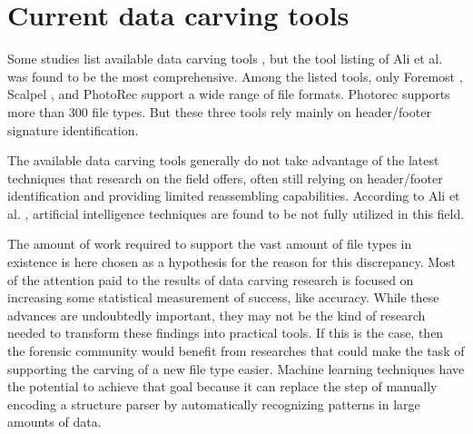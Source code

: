 \section{Current data carving tools}

Some studies list available data carving tools
\cite{ali_review_2018}
\cite{qiu_new_2014}
\cite{nadeem_ashraf_forensic_2013}
\cite{roux_reconstructing_2008}, 
but the tool listing of Ali et al. \cite{ali_review_2018} was found to be the most comprehensive. Among the listed tools, only Foremost \cite{kendall_foremost_2019}, Scalpel \cite{richard_iii_scalpel:_2005}, and PhotoRec \cite{grenier_photorec_2019} support a wide range of file formats. Photorec supports more than 300 file types. But these three tools rely mainly on header/footer signature identification.

The available data carving tools generally do not take advantage of the latest techniques that research on the field offers, often still relying on header/footer identification and providing limited reassembling capabilities.
According to Ali et al. \cite{ali_review_2018}, artificial intelligence techniques are found to be not fully utilized in this field.

The amount of work required to support the vast amount of file types in existence is here chosen as a hypothesis for the reason for this discrepancy. Most of the attention paid to the results of data carving research is focused on increasing some statistical measurement of success, like accuracy. While these advances are undoubtedly important, they may not be the kind of research needed to transform these findings into practical tools. If this is the case, then the forensic community would benefit from researches that could make the task of supporting the carving of a new file type easier. Machine learning techniques have the potential to achieve that goal because it can replace the step of manually encoding a structure parser by automatically recognizing patterns in large amounts of data.

